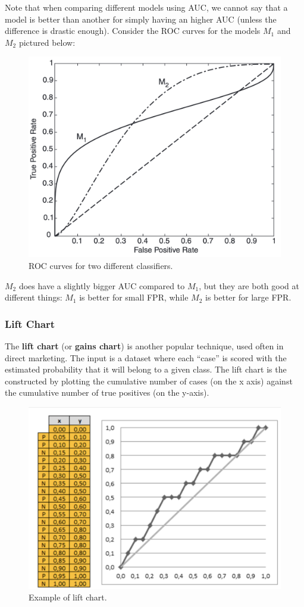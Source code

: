 Note that when comparing different models using AUC, we cannot say that a model is better than another for simply having an higher AUC (unless the difference is drastic enough). Consider the ROC curves for the models $M_1$ and $M_2$ pictured below:

\begin{figure}[h]
    \centering
    \includegraphics[width=0.5\linewidth]{img/ROC_comparison.png}
    \caption{ROC curves for two different classifiers.}
\end{figure}

$M_2$ does have a slightly bigger AUC compared to $M_1$, but they are both good at different things: $M_1$ is better for small FPR, while $M_2$ is better for large FPR.

\subsubsection{Lift Chart}

The \textbf{lift chart} (or \textbf{gains chart}) is another popular technique, used often in direct marketing. The input is a dataset where each ``case'' is scored with the estimated probability that it will belong to a given class. The lift chart is the constructed by plotting the cumulative number of cases (on the x axis) against the cumulative number of true positives (on the y-axis). 

\begin{figure}[h]
    \centering
    \includegraphics[width=0.5\linewidth]{img/Lift chart.png}
    \caption{Example of lift chart.}
\end{figure}

